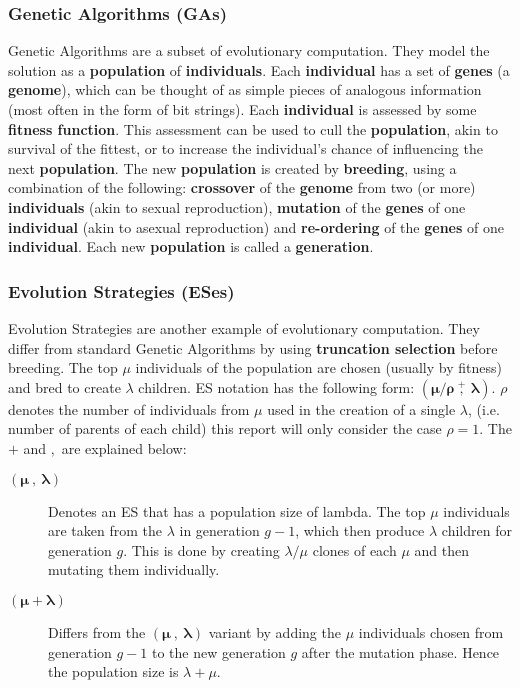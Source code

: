 \subsubsection*{Genetic Algorithms (GAs)}

Genetic Algorithms are a subset of evolutionary computation. They model the solution as a \textbf{population} of \textbf{individuals}. Each \textbf{individual} has a set of \textbf{genes} (a  \textbf{genome}), which can be thought of as simple pieces of analogous information (most often in the form of bit strings). Each \textbf{individual} is assessed by some \textbf{fitness function}. This assessment can be used to cull the \textbf{population}, akin to survival of the fittest, or to increase the individual's chance of influencing the next \textbf{population}. The new \textbf{population} is created by \textbf{breeding}, using a combination of the following: \textbf{crossover} of the \textbf{genome} from two (or more) \textbf{individuals} (akin to sexual reproduction), \textbf{mutation} of the \textbf{genes} of one \textbf{individual} (akin to asexual reproduction) and \textbf{re-ordering} of the \textbf{genes} of one \textbf{individual}. Each new \textbf{population} is called a \textbf{generation}. \cite[p.~7]{mitchellga}

\subsubsection*{Evolution Strategies (ESes)}

Evolution Strategies are another example of evolutionary computation. They differ from standard Genetic Algorithms by using \textbf{truncation selection} before breeding. The top $\mu$ individuals of the population are chosen (usually by fitness) and bred to create $\lambda$ children. ES notation has the following form:  $\pmb{(\mu / \rho \  \overset{+}{,} \  \lambda)}$. $\rho$ denotes the number of individuals from $\mu$ used in the creation of a single $\lambda$, (i.e. number of parents of each child) this report will only consider the case $\rho = 1$. The $+$ and $,$ are explained below:  \cite[p.~6-10]{es-book} \cite[s.~4.1.2]{ecj-manual}
\begin{description}
	\item[$\pmb{(\mu \  , \   \lambda)}$]  Denotes an ES that has a population size of lambda. The top $\mu$ individuals are taken from the $\lambda$ in generation $g-1$, which then produce $\lambda$ children for generation $g$. This is done by creating $\lambda / \mu$ clones of each $\mu$ and then mutating them individually. 
	\item[$\pmb{(\mu  + \lambda)}$] Differs from the $\pmb{(\mu \  , \   \lambda)}$ variant by adding the $\mu$ individuals chosen from generation $g-1$ to the new generation $g$ after the mutation phase. Hence the population size is $\lambda + \mu$.
\end{description}

